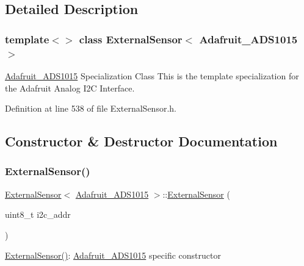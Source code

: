 \subsection{Detailed Description}
\subsubsection*{template$<$$>$\newline
class External\+Sensor$<$ Adafruit\+\_\+\+A\+D\+S1015 $>$}

\hyperlink{class_adafruit___a_d_s1015}{Adafruit\+\_\+\+A\+D\+S1015} Specialization Class This is the template specialization for the Adafruit Analog I2C Interface. 

Definition at line 538 of file External\+Sensor.\+h.



\subsection{Constructor \& Destructor Documentation}
\mbox{\label{class_external_sensor_3_01_adafruit___a_d_s1015_01_4_a5785138360de1f92f248c77f1d8e4536}} 
\subsubsection{\texorpdfstring{External\+Sensor()}{ExternalSensor()}}
{\footnotesize\ttfamily \hyperlink{class_external_sensor}{External\+Sensor}$<$ \hyperlink{class_adafruit___a_d_s1015}{Adafruit\+\_\+\+A\+D\+S1015} $>$\+::\hyperlink{class_external_sensor}{External\+Sensor} (\begin{DoxyParamCaption}\item[{uint8\+\_\+t}]{i2c\+\_\+addr }\end{DoxyParamCaption})\hspace{0.3cm}{\ttfamily [inline]}}

\hyperlink{class_external_sensor_3_01_adafruit___a_d_s1015_01_4_a5785138360de1f92f248c77f1d8e4536}{External\+Sensor()}\+: \hyperlink{class_adafruit___a_d_s1015}{Adafruit\+\_\+\+A\+D\+S1015} specific constructor 


